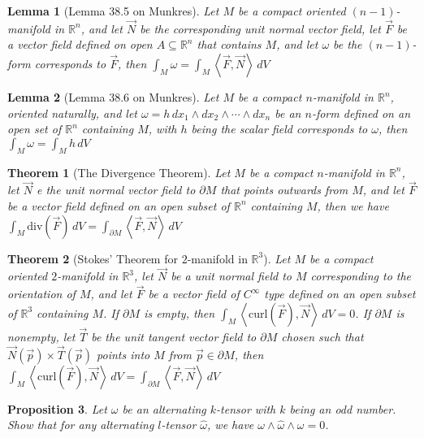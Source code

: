 \documentclass[9pt]{article}
\theoremstyle{break}
\theoremstyle{break}
\newtheorem{thm}{Theorem}[section]
\newtheorem{lem}{Lemma}[thm]
\newtheorem{prop}[lem]{Proposition}
\newcommand{\R}{\mathbb{R}}
\begin{document}
\begin{lem}[Lemma 38.5 on Munkres]
Let $M$ be a compact oriented $(n-1)$-manifold in $\R^n$, and let $\vec{N}$ be the corresponding unit normal vector field, let $\vec{F}$ be a vector field defined on open $A\subseteq \R^n$ that contains $M$, and let $\omega$ be the $(n-1)$-form corresponds to $\vec{F}$, then $\int_M \omega = \int_M \left< \vec{F},\vec{N}\right> \, dV$
\end{lem}

\begin{lem}[Lemma 38.6 on Munkres]
Let $M$ be a compact $n$-manifold in $\R^n$, oriented naturally, and let $\omega = h\, dx_1 \wedge dx_2 \wedge \cdots \wedge dx_n$ be an $n$-form defined on an open set of $\R^n$ containing $M$, with $h$ being the scalar field corresponds to $\omega$, then $\int_M \omega = \int_M h\, dV$
\end{lem}



\begin{thm}[The Divergence Theorem]
Let $M$ be a compact $n$-manifold in $\R^n$, let $\vec{N}$ e the unit normal vector field to $\partial M$ that points outwards from $M$, and let $\vec{F}$ be a vector field defined on an open subset of $\R^n$ containing $M$, then we have $\int_M \text{div}(\vec{F}) \, dV = \int_{\partial M}\left< \vec{F}, \vec{N}\right> \, dV$
\end{thm}

\begin{thm}[Stokes' Theorem for $2$-manifold in $\R^3$]
Let $M$ be a compact oriented $2$-manifold in $\R^3$, let $\vec{N}$ be a unit normal field to $M$ corresponding to the orientation of $M$, and let $\vec{F}$ be a vector field of $C^\infty$ type defined on an open subset of $\R^3$ containing $M$. If $\partial M$ is empty, then $\int_M \left< \text{curl}(\vec{F}),\vec{N}\right> \, dV = 0$.
If $\partial M$ is nonempty, let $\vec{T}$ be the unit tangent vector field to $\partial M$ chosen such that $\vec{N}(\vec{p}) \times \vec{T}(\vec{p})$ points into $M$ from $\vec{p}\in \partial M$, then $\int_M \left< \text{curl}(\vec{F}),\vec{N}\right> \, dV = \int_{\partial M}\left< \vec{F},\vec{N}\right>\, dV$
\end{thm}

\begin{prop}
Let $\omega$ be an alternating $k$-tensor with $k$ being an odd number. Show that for any alternating $l$-tensor $\hat{\omega}$, we have $\omega\wedge \hat{\omega}\wedge\omega = 0$. 
\end{prop}
\end{document}
